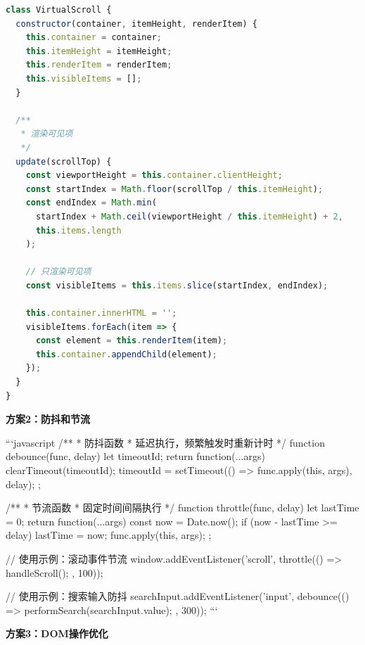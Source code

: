 \documentclass[12pt,a4paper]{article}
\begin{document}
\begin{lstlisting}[language=JavaScript, caption={虚拟滚动实现（简化版）}]
class VirtualScroll {
  constructor(container, itemHeight, renderItem) {
    this.container = container;
    this.itemHeight = itemHeight;
    this.renderItem = renderItem;
    this.visibleItems = [];
  }

  /**
   * 渲染可见项
   */
  update(scrollTop) {
    const viewportHeight = this.container.clientHeight;
    const startIndex = Math.floor(scrollTop / this.itemHeight);
    const endIndex = Math.min(
      startIndex + Math.ceil(viewportHeight / this.itemHeight) + 2,
      this.items.length
    );

    // 只渲染可见项
    const visibleItems = this.items.slice(startIndex, endIndex);
    
    this.container.innerHTML = '';
    visibleItems.forEach(item => {
      const element = this.renderItem(item);
      this.container.appendChild(element);
    });
  }
}
\end{lstlisting}

\textbf{方案2：防抖和节流}

```javascript
/**
 * 防抖函数
 * 延迟执行，频繁触发时重新计时
 */
function debounce(func, delay) {
  let timeoutId;
  return function(...args) {
    clearTimeout(timeoutId);
    timeoutId = setTimeout(() => func.apply(this, args), delay);
  };
}

/**
 * 节流函数
 * 固定时间间隔执行
 */
function throttle(func, delay) {
  let lastTime = 0;
  return function(...args) {
    const now = Date.now();
    if (now - lastTime >= delay) {
      lastTime = now;
      func.apply(this, args);
    }
  };
}

// 使用示例：滚动事件节流
window.addEventListener('scroll', throttle(() => {
  handleScroll();
}, 100));

// 使用示例：搜索输入防抖
searchInput.addEventListener('input', debounce(() => {
  performSearch(searchInput.value);
}, 300));
```

\textbf{方案3：DOM操作优化}
\end{document}
